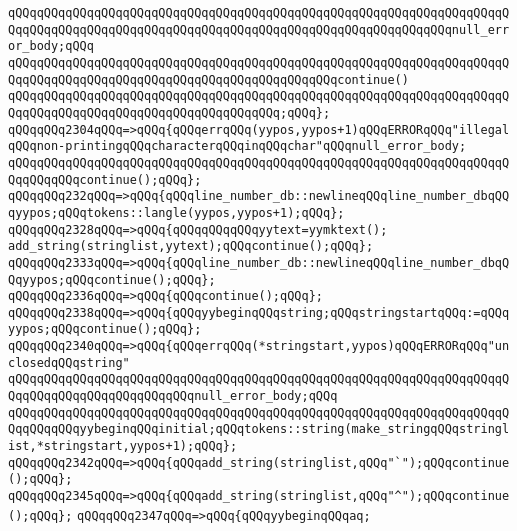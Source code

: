 \verb|qQQqqQQqqQQqqQQqqQQqqQQqqQQqqQQqqQQqqQQqqQQqqQQqqQQqqQQqqQQqqQQqqQQqqQQqqQQqqQQqqQQqqQQqqQQqqQQqqQQqqQQqqQQqqQQqqQQqqQQqqQQqqQQqqQQqnull_error_body;qQQq|\newline
\verb|qQQqqQQqqQQqqQQqqQQqqQQqqQQqqQQqqQQqqQQqqQQqqQQqqQQqqQQqqQQqqQQqqQQqqQQqqQQqqQQqqQQqqQQqqQQqqQQqqQQqqQQqqQQqqQQqqQQqcontinue()|\newline
\verb|qQQqqQQqqQQqqQQqqQQqqQQqqQQqqQQqqQQqqQQqqQQqqQQqqQQqqQQqqQQqqQQqqQQqqQQqqQQqqQQqqQQqqQQqqQQqqQQqqQQqqQQqqQQq;qQQq};|\newline
\verb|qQQqqQQq2304qQQq=>qQQq{qQQqerrqQQq(yypos,yypos+1)qQQqERRORqQQq"illegalqQQqnon-printingqQQqcharacterqQQqinqQQqchar"qQQqnull_error_body;|\newline
\verb|qQQqqQQqqQQqqQQqqQQqqQQqqQQqqQQqqQQqqQQqqQQqqQQqqQQqqQQqqQQqqQQqqQQqqQQqqQQqqQQqcontinue();qQQq};|\newline
\verb|qQQqqQQq232qQQq=>qQQq{qQQqline_number_db::newlineqQQqline_number_dbqQQqyypos;qQQqtokens::langle(yypos,yypos+1);qQQq};|\newline
\verb|qQQqqQQq2328qQQq=>qQQq{qQQqqQQqqQQqyytext=yymktext();|\newline
\verb|add_string(stringlist,yytext);qQQqcontinue();qQQq};|\newline
\verb|qQQqqQQq2333qQQq=>qQQq{qQQqline_number_db::newlineqQQqline_number_dbqQQqyypos;qQQqcontinue();qQQq};|\newline
\verb|qQQqqQQq2336qQQq=>qQQq{qQQqcontinue();qQQq};|\newline
\verb|qQQqqQQq2338qQQq=>qQQq{qQQqyybeginqQQqstring;qQQqstringstartqQQq:=qQQqyypos;qQQqcontinue();qQQq};|\newline
\verb|qQQqqQQq2340qQQq=>qQQq{qQQqerrqQQq(*stringstart,yypos)qQQqERRORqQQq"unclosedqQQqstring"|\newline
\verb|qQQqqQQqqQQqqQQqqQQqqQQqqQQqqQQqqQQqqQQqqQQqqQQqqQQqqQQqqQQqqQQqqQQqqQQqqQQqqQQqqQQqqQQqqQQqqQQqnull_error_body;qQQq|\newline
\verb|qQQqqQQqqQQqqQQqqQQqqQQqqQQqqQQqqQQqqQQqqQQqqQQqqQQqqQQqqQQqqQQqqQQqqQQqqQQqqQQqyybeginqQQqinitial;qQQqtokens::string(make_stringqQQqstringlist,*stringstart,yypos+1);qQQq};|\newline
\verb|qQQqqQQq2342qQQq=>qQQq{qQQqadd_string(stringlist,qQQq"`");qQQqcontinue();qQQq};|\newline
\verb|qQQqqQQq2345qQQq=>qQQq{qQQqadd_string(stringlist,qQQq"^");qQQqcontinue();qQQq};|\newline
\verb|qQQqqQQq2347qQQq=>qQQq{qQQqyybeginqQQqaq;|\newline
